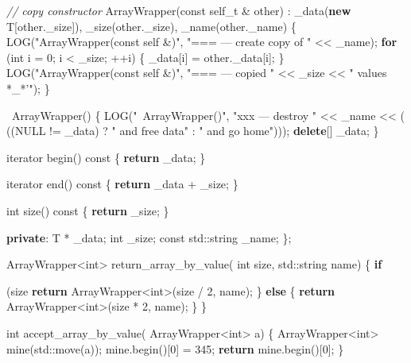 \documentclass[]{article}
\newenvironment{Shaded}{}{}
\newcommand{\KeywordTok}[1]{\textcolor[rgb]{0.00,0.44,0.13}{\textbf{{#1}}}}
\newcommand{\DataTypeTok}[1]{\textcolor[rgb]{0.56,0.13,0.00}{{#1}}}
\newcommand{\DecValTok}[1]{\textcolor[rgb]{0.25,0.63,0.44}{{#1}}}
\newcommand{\StringTok}[1]{\textcolor[rgb]{0.25,0.44,0.63}{{#1}}}
\newcommand{\CommentTok}[1]{\textcolor[rgb]{0.38,0.63,0.69}{\textit{{#1}}}}
\newcommand{\NormalTok}[1]{{#1}}
\begin{document}
\begin{Shaded}
\begin{Highlighting}[]
  \CommentTok{// copy constructor}
  \NormalTok{ArrayWrapper(}\DataTypeTok{const} \NormalTok{self_t & other)}
  \NormalTok{: _data(}\KeywordTok{new} \NormalTok{T[other._size]),}
    \NormalTok{_size(other._size),}
    \NormalTok{_name(other._name) \{}
    \NormalTok{LOG(}\StringTok{"ArrayWrapper(const self &)"}\NormalTok{,}
        \StringTok{"=== --- create copy of "} \NormalTok{<< _name);}
    \KeywordTok{for} \NormalTok{(}\DataTypeTok{int} \NormalTok{i = }\DecValTok{0}\NormalTok{; i < _size; ++i) \{}
      \NormalTok{_data[i] = other._data[i];}
    \NormalTok{\}}
    \NormalTok{LOG(}\StringTok{"ArrayWrapper(const self &)"}\NormalTok{,}
        \StringTok{"=== --- copied "} \NormalTok{<< _size << }\StringTok{" values *_*'"}\NormalTok{);}
  \NormalTok{\}}

  \NormalTok{~ArrayWrapper() \{}
    \NormalTok{LOG(}\StringTok{"~ArrayWrapper()"}\NormalTok{,}
        \StringTok{"xxx --- destroy "} \NormalTok{<< _name << (}
          \NormalTok{((NULL != _data) ? }\StringTok{" and free data"} \NormalTok{: }\StringTok{" and go home"}\NormalTok{)));}
    \KeywordTok{delete}\NormalTok{[] _data;}
  \NormalTok{\}}

  \NormalTok{iterator begin() }\DataTypeTok{const} \NormalTok{\{}
    \KeywordTok{return} \NormalTok{_data;}
  \NormalTok{\}}

  \NormalTok{iterator end() }\DataTypeTok{const} \NormalTok{\{}
    \KeywordTok{return} \NormalTok{_data + _size;}
  \NormalTok{\}}

  \DataTypeTok{int} \NormalTok{size() }\DataTypeTok{const} \NormalTok{\{}
    \KeywordTok{return} \NormalTok{_size;}
  \NormalTok{\}}

 \KeywordTok{private}\NormalTok{:}
  \NormalTok{T               * _data;}
  \DataTypeTok{int}               \NormalTok{_size;}
  \DataTypeTok{const} \NormalTok{std::string _name;}
\NormalTok{\};}


\NormalTok{ArrayWrapper<}\DataTypeTok{int}\NormalTok{>}
\NormalTok{return_array_by_value(}
  \DataTypeTok{int}         \NormalTok{size,}
  \NormalTok{std::string name) \{}
  \KeywordTok{if} \NormalTok{(size % }\DecValTok{2} \NormalTok{== }\DecValTok{0}\NormalTok{) \{}
    \KeywordTok{return} \NormalTok{ArrayWrapper<}\DataTypeTok{int}\NormalTok{>(size / }\DecValTok{2}\NormalTok{, name);}
  \NormalTok{\} }\KeywordTok{else} \NormalTok{\{}
    \KeywordTok{return} \NormalTok{ArrayWrapper<}\DataTypeTok{int}\NormalTok{>(size * }\DecValTok{2}\NormalTok{, name);}
  \NormalTok{\}}
\NormalTok{\}}

\DataTypeTok{int}
\NormalTok{accept_array_by_value(}
  \NormalTok{ArrayWrapper<}\DataTypeTok{int}\NormalTok{> a) \{}
  \NormalTok{ArrayWrapper<}\DataTypeTok{int}\NormalTok{> mine(std::move(a));}
  \NormalTok{mine.begin()[}\DecValTok{0}\NormalTok{] = }\DecValTok{345}\NormalTok{;}
  \KeywordTok{return} \NormalTok{mine.begin()[}\DecValTok{0}\NormalTok{];}
\NormalTok{\}}

}
\end{Highlighting}
\end{Shaded}
\end{document}
